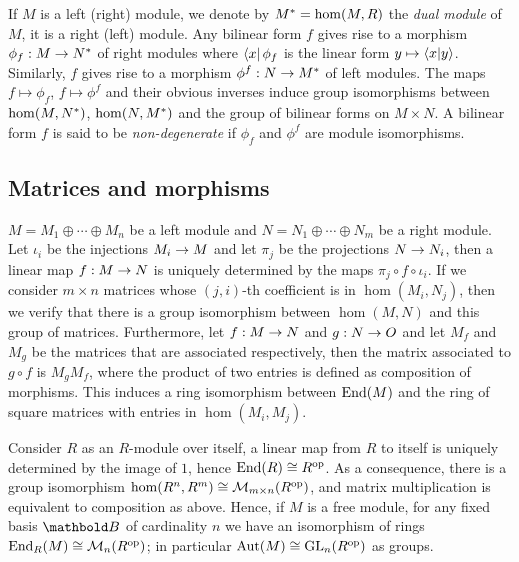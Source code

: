 If $M$ is a left (right) module, we denote by $M^\ast=\hom(M,R)$ the
\emph{dual
  module} of $M$, it is a right (left) module.
Any bilinear form $f$ gives rise to a morphism $ \phi_f : M \rightarrow
N^\ast$ of right modules where $\left\langle x \right\rvert\phi_f$ is the linear form $y
\mapsto \left\langle x \middle| y \right\rangle$. Similarly, $f$ gives rise to a morphism
$\phi^f:N\rightarrow M^\ast$ of left modules. The maps $f\mapsto\phi_f$,
$f\mapsto\phi^f$ and their obvious inverses induce group isomorphisms
between $\hom(M,N^\ast)$, $\hom(N,M^\ast)$ and the group of
bilinear forms on $M\times N$.  A bilinear form $f$ is said to be
\emph{non-degenerate} if $\phi_f$
and $\phi^f$ are module isomorphisms.


\subsection{Matrices and morphisms}
\label{sec:linear-algebra:matrices}
$M=M_1\oplus\cdots\oplus M_n$ be a left module and
$N=N_1\oplus\cdots\oplus N_m$ be a right module.  Let $\iota_i$ be the
injections $M_i\rightarrow M$ and let $\pi_j$ be the projections $N\rightarrow N_i$,
then a linear map $f:M\rightarrow N$ is uniquely determined by the maps
$\pi_j\circ f\circ\iota_i$. If we consider $m\times n$ matrices whose
$(j,i)$-th coefficient is in $\hom(M_i,N_j)$, then we verify that
there is a group isomorphism between $\hom(M,N)$ and this group of
matrices. Furthermore, let $f:M\rightarrow N$ and $g:N\rightarrow O$ and let $M_f$ and
$M_g$ be the matrices that are associated respectively, then the
matrix associated to $g\circ f$ is $M_gM_f$, where the product of two
entries is defined as composition of morphisms. This induces a ring
isomorphism between $\operatorname{End}(M)$ and the ring of square matrices with
entries in $\hom(M_i,M_j)$.

Consider $R$ as an $R$-module over itself, a linear map from $R$ to
itself is uniquely determined by the image of $1$, hence $\operatorname{End}(R)\cong
R^{\mathrm{op}}$. As a consequence, there is a group isomorphism
$\hom(R^n,R^m)\cong\operatorname{\mathcal{M}}_{m\times n}(R^{\mathrm{op}})$, and matrix multiplication
is equivalent to composition as above.  Hence, if $M$ is a free
module, for any fixed basis $\basis{B}$ of cardinality $n$ we have an
isomorphism of rings $\operatorname{End}_R(M)\cong\operatorname{\mathcal{M}}_n(R^{\mathrm{op}})$; in particular
$\operatorname{Aut}(M)\cong\operatorname{GL}_n(R^{\mathrm{op}})$ as groups.


